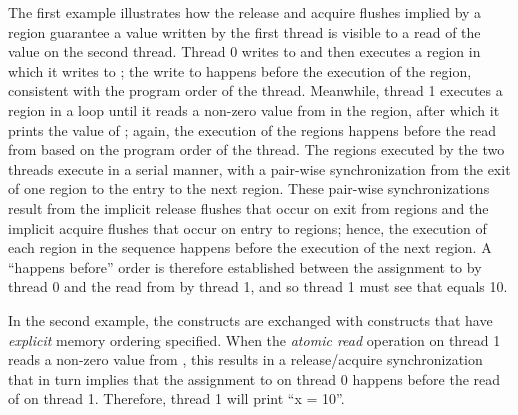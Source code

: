 
The first example illustrates how the release and acquire flushes implied by a
 region guarantee a value written by the first thread is visible
to a read of the value on the second thread. Thread 0 writes to  and
then executes a  region in which it writes to ; the write
to  happens before the execution of the  region,
consistent with the program order of the thread.  Meanwhile, thread 1 executes a
 region in a loop until it reads a non-zero value from
 in the  region, after which it prints the value of
; again, the execution of the  regions happens before the
read from  based on the program order of the thread. The 
regions executed by the two threads execute in a serial manner, with a
pair-wise synchronization from the exit of one  region to the
entry to the next  region.  These pair-wise synchronizations
result from the implicit release flushes that occur on exit from
 regions and the implicit acquire flushes that occur on entry to
 regions; hence, the execution of each  region in
the sequence happens before the execution of the next  region.
A ``happens before'' order is therefore established between the assignment to 
by thread 0 and the read from  by thread 1, and so thread 1 must see that
 equals 10.

{}

In the second example, the  constructs are exchanged with
 constructs that have \emph{explicit} memory ordering specified. When the
\emph{atomic read} operation on thread 1 reads a non-zero value from , this
results in a release/acquire synchronization that in turn implies that the
assignment to  on thread 0 happens before the read of  on thread
1. Therefore, thread 1 will print ``x = 10''.

